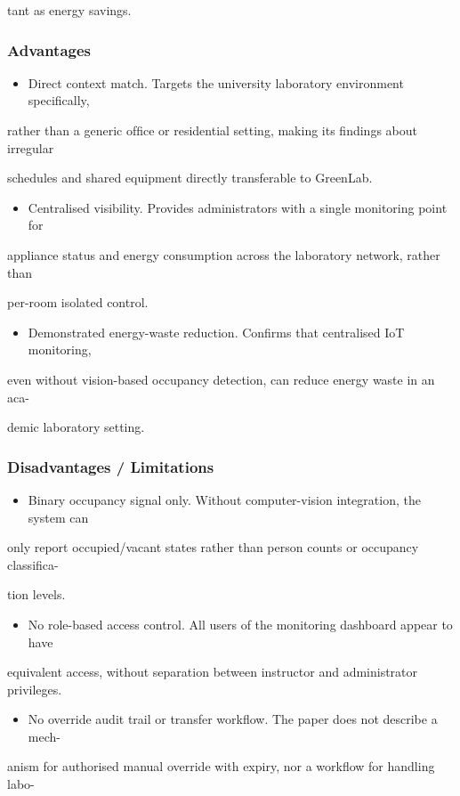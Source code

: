 tant as energy savings.


\subsubsection*{Advantages}
\begin{itemize}
	\item Direct context match. Targets the university laboratory environment speciﬁcally,
\end{itemize}
rather than a generic ofﬁce or residential setting, making its ﬁndings about irregular

schedules and shared equipment directly transferable to GreenLab.

\begin{itemize}
	\item Centralised visibility. Provides administrators with a single monitoring point for
\end{itemize}
appliance status and energy consumption across the laboratory network, rather than

per-room isolated control.

\begin{itemize}
	\item Demonstrated energy-waste reduction. Conﬁrms that centralised IoT monitoring,
\end{itemize}
even without vision-based occupancy detection, can reduce energy waste in an aca-

demic laboratory setting.


\subsubsection*{Disadvantages / Limitations}
\begin{itemize}
	\item Binary occupancy signal only. Without computer-vision integration, the system can
\end{itemize}
only report occupied/vacant states rather than person counts or occupancy classiﬁca-

tion levels.

\begin{itemize}
	\item No role-based access control. All users of the monitoring dashboard appear to have
\end{itemize}
equivalent access, without separation between instructor and administrator privileges.

\begin{itemize}
	\item No override audit trail or transfer workﬂow. The paper does not describe a mech-
\end{itemize}
anism for authorised manual override with expiry, nor a workﬂow for handling labo-

